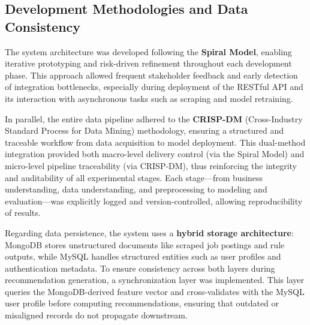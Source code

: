 \documentclass[runningheads]{llncs}
\begin{document}
	\subsection{Development Methodologies and Data Consistency}
	
	The system architecture was developed following the \textbf{Spiral Model}, enabling iterative prototyping and risk-driven refinement throughout each development phase. This approach allowed frequent stakeholder feedback and early detection of integration bottlenecks, especially during deployment of the RESTful API and its interaction with asynchronous tasks such as scraping and model retraining.
	
	In parallel, the entire data pipeline adhered to the \textbf{CRISP-DM} (Cross-Industry Standard Process for Data Mining) methodology, ensuring a structured and traceable workflow from data acquisition to model deployment. This dual-method integration provided both macro-level delivery control (via the Spiral Model) and micro-level pipeline traceability (via CRISP-DM), thus reinforcing the integrity and auditability of all experimental stages. Each stage—from business understanding, data understanding, and preprocessing to modeling and evaluation—was explicitly logged and version-controlled, allowing reproducibility of results.
	
	Regarding data persistence, the system uses a \textbf{hybrid storage architecture}: MongoDB stores unstructured documents like scraped job postings and rule outputs, while MySQL handles structured entities such as user profiles and authentication metadata. To ensure consistency across both layers during recommendation generation, a synchronization layer was implemented. This layer queries the MongoDB-derived feature vector and cross-validates with the MySQL user profile before computing recommendations, ensuring that outdated or misaligned records do not propagate downstream.
	
\end{document}

